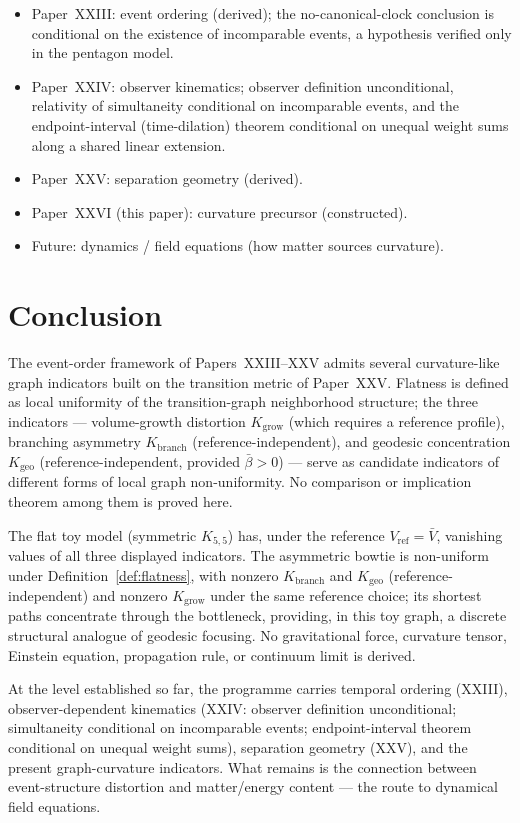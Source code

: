\documentclass[12pt]{article}
\begin{document}
\begin{itemize}
    \item Paper~XXIII: event ordering (derived); the no-canonical-clock conclusion is conditional on the existence of incomparable events, a hypothesis verified only in the pentagon model.
    \item Paper~XXIV: observer kinematics; observer definition unconditional, relativity of simultaneity conditional on incomparable events, and the endpoint-interval (time-dilation) theorem conditional on unequal weight sums along a shared linear extension.
    \item Paper~XXV: separation geometry (derived).
    \item Paper~XXVI (this paper): curvature precursor (constructed).
    \item Future: dynamics / field equations (how matter sources curvature).
\end{itemize}

\section{Conclusion}\label{sec:conclusion}

The event-order framework of Papers~XXIII--XXV admits several curvature-like graph indicators built on the transition metric of Paper~XXV. Flatness is defined as local uniformity of the transition-graph neighborhood structure; the three indicators --- volume-growth distortion $K_{\mathrm{grow}}$ (which requires a reference profile), branching asymmetry $K_{\mathrm{branch}}$ (reference-independent), and geodesic concentration $K_{\mathrm{geo}}$ (reference-independent, provided $\bar\beta > 0$) --- serve as candidate indicators of different forms of local graph non-uniformity. No comparison or implication theorem among them is proved here.

The flat toy model (symmetric $K_{5,5}$) has, under the reference $V_{\mathrm{ref}} = \bar V$, vanishing values of all three displayed indicators. The asymmetric bowtie is non-uniform under Definition~\ref{def:flatness}, with nonzero $K_{\mathrm{branch}}$ and $K_{\mathrm{geo}}$ (reference-independent) and nonzero $K_{\mathrm{grow}}$ under the same reference choice; its shortest paths concentrate through the bottleneck, providing, in this toy graph, a discrete structural analogue of geodesic focusing. No gravitational force, curvature tensor, Einstein equation, propagation rule, or continuum limit is derived.

At the level established so far, the programme carries temporal ordering (XXIII), observer-dependent kinematics (XXIV: observer definition unconditional; simultaneity conditional on incomparable events; endpoint-interval theorem conditional on unequal weight sums), separation geometry (XXV), and the present graph-curvature indicators. What remains is the connection between event-structure distortion and matter/energy content --- the route to dynamical field equations.



\end{document}

